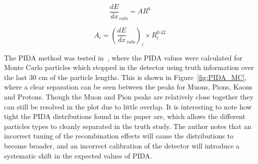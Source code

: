\begin{equation}
  \label{eq:PIDA}
  \frac{dE}{dx}_{calo} = A R^b
\end{equation}

\begin{equation}
  \label{eq:PIDA_A}
  A_i = (\frac{dE}{dx}_{calo})_i \times R^{0.42}_i
\end{equation}

The PIDA method was tested in~\citep{PIDA_Paper}, where the PIDA values were calculated for Monte Carlo particles which stopped in the detector using truth information over the last 30 cm of the particle lengths. This is shown in Figure~\ref{fig:PIDA_MC}, where a clear separation can be seen between the peaks for Muons, Pions, Kaons and Protons. Though the Muon and Pion peaks are relatively close together they can still be resolved in the plot due to little overlap. It is interesting to note how tight the PIDA distributions found in the paper are, which allows the different particles types to cleanly separated in the truth study. The author notes that an incorrect tuning of the recombination effects will cause the distributions to become broader, and an incorrect calibration of the detector will introduce a systematic shift in the expected values of PIDA. \\

